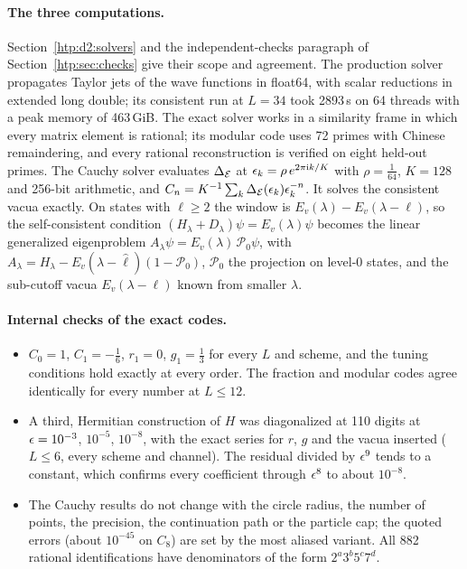 \paragraph{The three computations.} Section~\ref{htp:d2:solvers} and the independent-checks paragraph of
Section~\ref{htp:sec:checks} give their scope and agreement. The production solver propagates Taylor jets of the wave
functions in float64, with scalar reductions in extended long double; its consistent run at $L=34$ took 2893\,s on 64
threads with a peak memory of 463\,GiB. The exact solver works in a similarity frame in which every matrix element is
rational; its modular code uses 72 primes with Chinese remaindering, and every rational reconstruction is verified on
eight held-out primes. The Cauchy solver evaluates $\Delta_{\mathcal E}$ at $\epsilon_k=\rho\,e^{2\pi\mathrm ik/K}$ with $\rho=\frac1{64}$,
$K=128$ and 256-bit arithmetic, and $C_n=K^{-1}\sum_k\Delta_{\mathcal E}(\epsilon_k)\epsilon_k^{-n}$. It solves the consistent vacua exactly. On states with
$\ell\ge2$ the window is $E_v(\lambda)-E_v(\lambda-\ell)$, so the self-consistent condition $(H_\lambda+D_\lambda)\psi=E_v(\lambda)\psi$
becomes the linear generalized eigenproblem $A_\lambda\psi=E_v(\lambda)\,\mathcal P_0\psi$, with
$A_\lambda=H_\lambda-E_v(\lambda-\hat\ell)(1-\mathcal P_0)$, $\mathcal P_0$ the projection on level-0 states, and the
sub-cutoff vacua $E_v(\lambda-\ell)$ known from smaller $\lambda$.

\paragraph{Internal checks of the exact codes.}
\begin{itemize}
\item $C_0=1$, $C_1=-\frac16$, $r_1=0$, $g_1=\frac13$ for every $L$ and scheme, and the tuning conditions hold exactly at
 every order. The fraction and modular codes agree identically for every number at $L\le12$.
\item A third, Hermitian construction of $H$ was diagonalized at 110 digits at $\epsilon=10^{-3}$, $10^{-5}$, $10^{-8}$, with the
 exact series for $r$, $g$ and the vacua inserted ($L\le6$, every scheme and channel). The residual divided by $\epsilon^9$
 tends to a constant, which confirms every coefficient through $\epsilon^8$ to about $10^{-8}$.
\item The Cauchy results do not change with the circle radius, the number of points, the precision, the continuation path
 or the particle cap; the quoted errors (about $10^{-45}$ on $C_8$) are set by the most aliased variant. All 882 rational
 identifications have denominators of the form $2^a3^b5^c7^d$.
\end{itemize}

